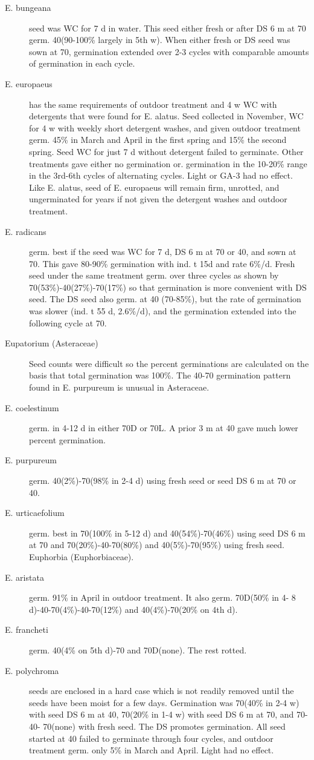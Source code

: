 \begin{description}
\item[E. bungeana] seed was WC for 7 d in water. This seed either fresh or after DS 6
m at 70 germ. 40(90-100\% largely in 5th w). When either fresh or DS seed was sown
at 70, germination extended over 2-3 cycles with comparable amounts of germination
in each cycle.

\item[E. europaeus] has the same requirements of outdoor treatment and 4 w WC with
detergents that were found for E. alatus. Seed collected in November, WC for 4 w with
weekly short detergent washes, and given outdoor treatment germ. 45\% in March and
April in the first spring and 15\% the second spring. Seed WC for just 7 d without
detergent failed to germinate. Other treatments gave either no germination or.
germination in the 10-20\% range in the 3rd-6th cycles of alternating cycles. Light or
GA-3 had no effect. Like E. alatus, seed of E. europaeus will remain firm, unrotted, and
ungerminated for years if not given the detergent washes and outdoor treatment.

\item[E. radicans] germ. best if the seed was WC for 7 d, DS 6 m at 70 or 40, and sown
at 70. This gave 80-90\% germination with ind. t 15d and rate 6\%/d. Fresh seed under
the same treatment germ. over three cycles as shown by 70(53\%)-40(27\%)-70(17\%)
so that germination is more convenient with DS seed. The DS seed also germ. at 40
(70-85\%), but the rate of germination was slower (ind. t 55 d, 2.6\%/d), and the
germination extended into the following cycle at 70.

\item[Eupatorium (Asteraceae)] Seed counts were difficult so the percent
germinations are calculated on the basis that total germination was 100\%. The 40-70
germination pattern found in E. purpureum is unusual in Asteraceae.

\item[E. coelestinum] germ. in 4-12 d in either 70D or 70L. A prior 3 m at 40 gave
much lower percent germination.
\item[E. purpureum] germ. 40(2\%)-70(98\% in 2-4 d) using fresh seed or seed DS 6 m
at 70 or 40.
\item[E. urticaefolium] germ. best in 70(100\% in 5-12 d) and 40(54\%)-70(46\%) using
seed DS 6 m at 70 and 70(20\%)-40-70(80\%) and 40(5\%)-70(95\%) using fresh seed.
Euphorbia (Euphorbiaceae).
\item[E. aristata] germ. 91\% in April in outdoor treatment. It also germ. 70D(50\% in 4-
8 d)-40-70(4\%)-40-70(12\%) and 40(4\%)-70(20\% on 4th d).
\item[E. francheti] germ. 40(4\% on 5th d)-70 and 70D(none). The rest rotted.
\item[E. polychroma] seeds are enclosed in a hard case which is not readily removed
until the seeds have been moist for a few days. Germination was 70(40\% in 2-4 w)
with seed DS 6 m at 40, 70(20\% in 1-4 w) with seed DS 6 m at 70, and 70-40-
70(none) with fresh seed. The DS promotes germination. All seed started at 40 failed
to germinate through four cycles, and outdoor treatment germ. only 5\% in March and
April. Light had no effect.


\end{description}
